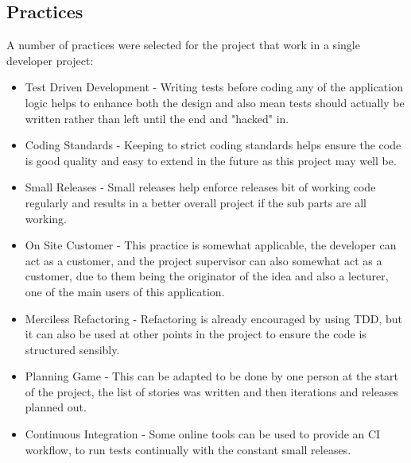 \subsection{Practices}
A number of practices were selected for the project that work in a single developer project:
\begin{itemize}
	\item Test Driven Development - Writing tests before coding any of the application logic helps to enhance both the design and also mean tests should actually be written rather than left until the end and "hacked" in.
	\item Coding Standards - Keeping to strict coding standards helps ensure the code is good quality and easy to extend in the future as this project may well be.
	\item Small Releases - Small releases help enforce releases bit of working code regularly and results in a better overall project if the sub parts are all working.
	\item On Site Customer - This practice is somewhat applicable, the developer can act as a customer, and the project supervisor can also somewhat act as a customer, due to them being the originator of the idea and also a lecturer, one of the main users of this application.
	\item Merciless Refactoring - Refactoring is already encouraged by using TDD, but it can also be used at other points in the project to ensure the code is structured sensibly.
	\item Planning Game - This can be adapted to be done by one person at the start of the project, the list of stories was written and then iterations and releases planned out.
	\item Continuous Integration - Some online tools can be used to provide an CI workflow, to run tests continually with the constant small releases.
\end{itemize}

